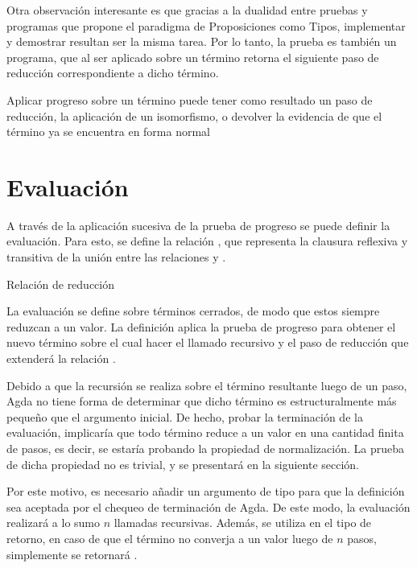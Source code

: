 Otra observación interesante es que gracias a la dualidad entre pruebas y programas que propone el paradigma de Proposiciones como Tipos, implementar y demostrar resultan ser la misma tarea.
Por lo tanto, la prueba  es también un programa, que al ser aplicado sobre un término retorna el siguiente paso de reducción correspondiente a dicho término.

\begin{example}
	Aplicar progreso sobre un término puede tener como resultado un paso de reducción, la aplicación de un isomorfismo, o devolver la evidencia de que el término ya se encuentra en forma normal
\end{example}

\section{Evaluación}

A través de la aplicación sucesiva de la prueba de progreso se puede definir la evaluación.
Para esto, se define la relación \type{$\_\rightsquigarrow\_$}, que representa la clausura reflexiva y transitiva de la unión entre las relaciones \type{$\_\hookrightarrow\_$} y \type{$\_\rightleftarrows\_$}.

\begin{codigo}
	Relación de reducción
\end{codigo}

La evaluación se define sobre términos cerrados, de modo que estos siempre reduzcan a un valor.
La definición aplica la prueba de progreso para obtener el nuevo término sobre el cual hacer el llamado recursivo y el paso de reducción que extenderá la relación \type{$\_\rightsquigarrow\_$}.

Debido a que la recursión se realiza sobre el término resultante luego de un paso, Agda no tiene forma de determinar que dicho término es estructuralmente más pequeño que el argumento inicial.
De hecho, probar la terminación de la evaluación, implicaría que todo término reduce a un valor en una cantidad finita de pasos, es decir, se estaría probando la propiedad de normalización.
La prueba de dicha propiedad no es trivial, y se presentará en la siguiente sección.

Por este motivo, es necesario añadir un argumento de tipo  para que la definición sea aceptada por el chequeo de terminación de Agda.
De este modo, la evaluación realizará a lo sumo $n$ llamadas recursivas.
Además, se utiliza  en el tipo de retorno, en caso de que el término no converja a un valor luego de $n$ pasos, simplemente se retornará .


